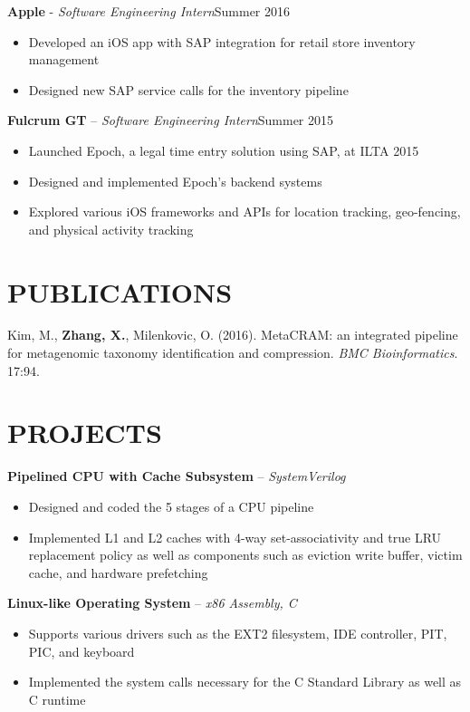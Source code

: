 \documentclass[resmargin]{res}
\begin{document}
\begin{resume}
	\vspace{-3mm}
	{\bf Apple} - {\sl Software Engineering Intern}\hfill Summer 2016
		\begin{itemize} \itemsep -1pt
		\item Developed an iOS app with SAP integration for retail store inventory management
		\item Designed new SAP service calls for the inventory pipeline
	\end{itemize}
	
	\vspace{-3mm}
	{\bf Fulcrum GT} -- {\sl Software Engineering Intern}\hfill Summer 2015
		\begin{itemize} \itemsep -1pt
		\item Launched Epoch, a legal time entry solution using SAP, at ILTA 2015
		\item Designed and implemented Epoch's backend systems 
		\item Explored various iOS frameworks and APIs for location tracking, geo-fencing, and physical activity tracking
	\end{itemize}

\vspace{-3mm}
\section{PUBLICATIONS}
	\textnormal{Kim, M., \textbf{Zhang, X.}, Milenkovic, O. (2016). MetaCRAM: an integrated pipeline for metagenomic taxonomy identification and compression. \textit{BMC Bioinformatics}. 17:94.}
 
\vspace{-3mm}
\section{PROJECTS} 

	{\bf Pipelined CPU with Cache Subsystem} -- {\sl SystemVerilog} 
	\begin{itemize} \itemsep -1pt
	    \item Designed and coded the 5 stages of a CPU pipeline 
	    \item Implemented L1 and L2 caches with 4-way set-associativity and true LRU replacement policy as well as components such as eviction write buffer, victim cache, and hardware prefetching
	\end{itemize}
	
	\vspace{-3mm}
	{\bf Linux-like Operating System} -- {\sl x86 Assembly, C} 
	\begin{itemize} \itemsep -1pt
	    \item Supports various drivers such as the EXT2 filesystem, IDE controller, PIT, PIC, and keyboard
	    \item Implemented the system calls necessary for the C Standard Library as well as C runtime
	\end{itemize}
	

\end{resume}
\end{document}
